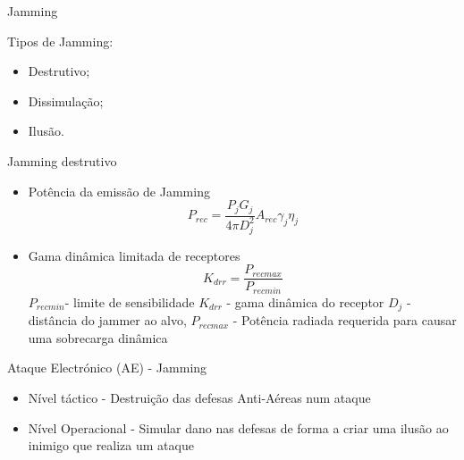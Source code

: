 \documentclass[portuguese,10pt]{beamer}
\begin{document}
\begin{frame}{Jamming}
    
    Tipos de Jamming:
      \vspace*{5mm}
    \begin{itemize}
        \item Destrutivo;
        \vspace*{3mm}
        \item  Dissimulação; 
        \vspace*{3mm}
        \item Ilusão.
    
    \end{itemize}
    
   
\end{frame}



\begin{frame}{Jamming destrutivo }
    
      \vspace*{5mm}
    \begin{itemize}
    \item Potência da emissão de Jamming \begin{equation*}
P_{rec}= \frac{P_j G_j}{4 \pi D_j ^2} A_{rec} \gamma_j \eta_j    
\end{equation*}

\item Gama dinâmica limitada de receptores 
\begin{equation*}
K_{drr}= \frac{P_{rec max}}{P_{rec min}}    
\end{equation*}
$P_{rec min}$- limite de sensibilidade  $K_{drr}$ - gama dinâmica do receptor $D_j$ - distância do jammer ao alvo, $P_{rec max}$ - Potência radiada requerida para causar uma sobrecarga dinâmica
    \end{itemize}
    
  \end{frame}




\begin{frame}{Ataque Electrónico (AE) - Jamming}\Large
    
    
      \vspace*{5mm}
    \begin{itemize}
        \item Nível táctico - Destruição das defesas Anti-Aéreas num ataque
        \vspace*{6mm}
        \item  Nível Operacional - Simular dano nas defesas de forma a criar uma ilusão ao inimigo que realiza um ataque
        \vspace*{3mm}
     
    
    \end{itemize}
    \end{frame}
\end{document}
